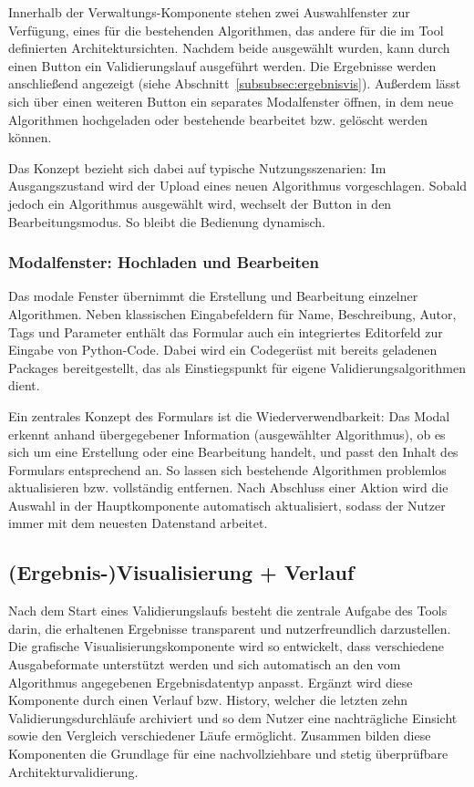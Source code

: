 Innerhalb der Verwaltungs-Komponente stehen zwei Auswahlfenster zur Verfügung, eines für die bestehenden Algorithmen, das andere für die im Tool definierten Architektursichten. Nachdem beide ausgewählt wurden, kann durch einen Button ein Validierungslauf ausgeführt werden. Die Ergebnisse werden anschließend angezeigt (siehe Abschnitt~\ref{subsubsec:ergebnisvis}). Außerdem lässt sich über einen weiteren Button ein separates Modalfenster öffnen, in dem neue Algorithmen hochgeladen oder bestehende bearbeitet bzw. gelöscht werden können.

Das Konzept bezieht sich dabei auf typische Nutzungsszenarien: Im Ausgangszustand wird der Upload eines neuen Algorithmus vorgeschlagen. Sobald jedoch ein Algorithmus ausgewählt wird, wechselt der Button in den Bearbeitungsmodus. So bleibt die Bedienung dynamisch.

\subsubsection*{Modalfenster: Hochladen und Bearbeiten}

Das modale Fenster übernimmt die Erstellung und Bearbeitung einzelner Algorithmen. Neben klassischen Eingabefeldern für Name, Beschreibung, Autor, Tags und Parameter enthält das Formular auch ein integriertes Editorfeld zur Eingabe von Python-Code. Dabei wird ein Codegerüst mit bereits geladenen Packages bereitgestellt, das als Einstiegspunkt für eigene Validierungsalgorithmen dient.

Ein zentrales Konzept des Formulars ist die Wiederverwendbarkeit: Das Modal erkennt anhand übergegebener Information (ausgewählter Algorithmus), ob es sich um eine Erstellung oder eine Bearbeitung handelt, und passt den Inhalt des Formulars entsprechend an. So lassen sich bestehende Algorithmen problemlos aktualisieren bzw. vollständig entfernen. Nach Abschluss einer Aktion wird die Auswahl in der Hauptkomponente automatisch aktualisiert, sodass der Nutzer immer mit dem neuesten Datenstand arbeitet.

\subsection{(Ergebnis-)Visualisierung + Verlauf}
\label{subsec:visualisierung}

Nach dem Start eines Validierungslaufs besteht die zentrale Aufgabe des Tools darin, die erhaltenen Ergebnisse transparent und nutzerfreundlich darzustellen. Die grafische Visualisierungskomponente wird so entwickelt, dass verschiedene Ausgabeformate unterstützt werden und sich automatisch an den vom Algorithmus angegebenen Ergebnisdatentyp anpasst. Ergänzt wird diese Komponente durch einen Verlauf bzw. History, welcher die letzten zehn Validierungsdurchläufe archiviert und so dem Nutzer eine nachträgliche Einsicht sowie den Vergleich verschiedener Läufe ermöglicht. Zusammen bilden diese Komponenten die Grundlage für eine nachvollziehbare und stetig überprüfbare Architekturvalidierung.

